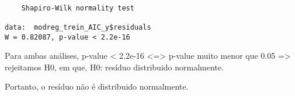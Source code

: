 \documentclass[11pt]{article}
\begin{document}
\begin{enumerate}
\begin{verbatim}

	Shapiro-Wilk normality test

data:  modreg_trein_AIC_y$residuals
W = 0.82087, p-value < 2.2e-16

\end{verbatim}


Para ambas análises, p-value < 2.2e-16 <=> p-value muito menor que 0.05 => rejeitamos H0, em que, H0: resíduo distribuido normalmente.

Portanto, o resíduo não é distribuido normalmente.
\end{enumerate}
\end{document}
